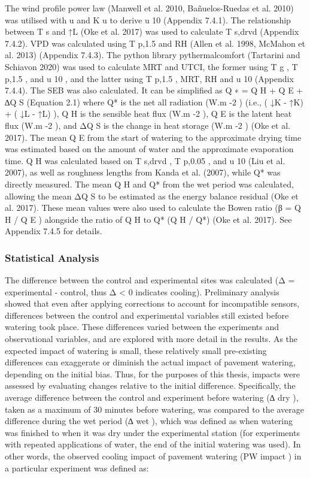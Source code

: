 \documentclass[final,3p,times,authoryear]{elsarticle}
\begin{document}
The wind profile power law (Manwell et al. 2010, Bañuelos-Ruedas et al. 2010) was
utilised with u and K u to derive u 10 (Appendix 7.4.1). The relationship between T s and
↑L (Oke et al. 2017) was used to calculate T s,drvd (Appendix 7.4.2). VPD was calculated
using T p,1.5 and RH (Allen et al. 1998, McMahon et al. 2013) (Appendix 7.4.3). The
python library pythermalcomfort (Tartarini and Schiavon 2020) was used to calculate
MRT and UTCI, the former using T g , T p,1.5 , and u 10 , and the latter using T p,1.5 , MRT, RH
and u 10 (Appendix 7.4.4).
The SEB was also calculated. It can be simplified as
Q ∗ = Q H + Q E + ∆Q S
(Equation 2.1)
where Q* is the net all radiation (W.m -2 ) (i.e., ( ↓K - ↑K) + ( ↓L - ↑L) ), Q H is the sensible
heat flux (W.m -2 ), Q E is the latent heat flux (W.m -2 ), and ΔQ S is the change in heat
storage (W.m -2 ) (Oke et al. 2017). The mean Q E from the start of watering to the
approximate drying time was estimated based on the amount of water and the
approximate evaporation time. Q H was calculated based on T s,drvd , T p,0.05 , and u 10 (Liu et
al. 2007), as well as roughness lengths from Kanda et al. (2007), while Q* was directly
measured. The mean Q H and Q* from the wet period was calculated, allowing the mean
ΔQ S to be estimated as the energy balance residual (Oke et al. 2017). These mean values
were also used to calculate the Bowen ratio (β = Q H / Q E ) alongside the ratio of Q H to
Q* (Q H / Q*) (Oke et al. 2017). See Appendix 7.4.5 for details.


\subsubsection{Statistical Analysis}\label{sec:methods2.2.3}

The difference between the control and experimental sites was calculated (Δ =
experimental - control, thus Δ < 0 indicates cooling).
Preliminary analysis showed that even after applying corrections to account for
incompatible sensors, differences between the control and experimental variables still
existed before watering took place. These differences varied between the experiments
and observational variables, and are explored with more detail in the results. As the
expected impact of watering is small, these relatively small pre-existing differences can
exaggerate or diminish the actual impact of pavement watering, depending on the initial
bias.
Thus, for the purposes of this thesis, impacts were assessed by evaluating changes
relative to the initial difference. Specifically, the average difference between the control
and experiment before watering (∆ dry ), taken as a maximum of 30 minutes before
watering, was compared to the average difference during the wet period (∆ wet ), which
was defined as when watering was finished to when it was dry under the experimental
station (for experiments with repeated applications of water, the end of the initial
watering was used). In other words, the observed cooling impact of pavement watering
(PW impact ) in a particular experiment was defined as:
\end{document}
